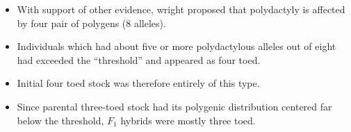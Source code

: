 \documentclass[11pt,dvipsnames,ignorenonframetext,aspectratio=169]{beamer}
\providecommand{\tightlist}{%
  \setlength{\itemsep}{0pt}\setlength{\parskip}{0pt}}
\begin{document}
\begin{frame}{}
\protect\hypertarget{section-8}{}

\begin{itemize}
\tightlist
\item
  With support of other evidence, wright proposed that polydactyly is
  affected by four pair of polygens (8 alleles).
\item
  Individuals which had about five or more polydactylous alleles out of
  eight had exceeded the ``threshold'' and appeared as four toed.
\item
  Initial four toed stock was therefore entirely of this type.
\item
  Since parental three-toed stock had its polygenic distribution
  centered far below the threshold, \(F_1\) hybrids were mostly three
  toed.
\end{itemize}

\end{frame}
\end{document}
